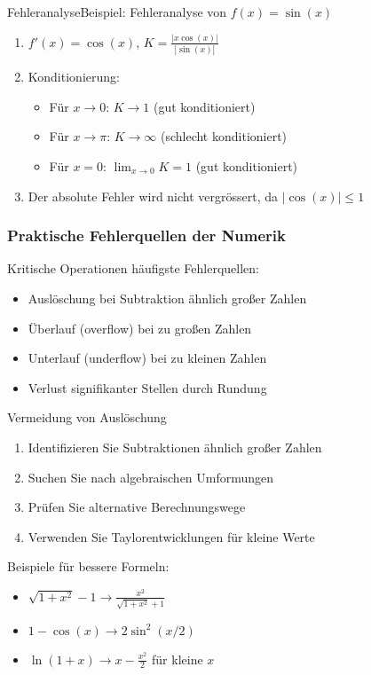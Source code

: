 \begin{example2}{Fehleranalyse}Beispiel: Fehleranalyse von $f(x)=\sin(x)$
\begin{enumerate}
    \item $f'(x) = \cos(x)$, $K = \frac{|x\cos(x)|}{|\sin(x)|}$
    \item Konditionierung:
    \begin{itemize}
    \item Für $x \to 0$: $K \to 1$ (gut konditioniert)
    \item Für $x \to \pi$: $K \to \infty$ (schlecht konditioniert)
    \item Für $x = 0$: $\lim_{x \to 0} K = 1$ (gut konditioniert)
    \end{itemize}
    \item Der absolute Fehler wird nicht vergrössert, da $|\cos(x)| \leq 1$
\end{enumerate}
\end{example2}

\subsubsection{Praktische Fehlerquellen der Numerik}

\begin{concept}{Kritische Operationen} häufigste Fehlerquellen:
\begin{itemize}
    \item Auslöschung bei Subtraktion ähnlich großer Zahlen
    \item Überlauf (overflow) bei zu großen Zahlen
    \item Unterlauf (underflow) bei zu kleinen Zahlen
    \item Verlust signifikanter Stellen durch Rundung
\end{itemize}
\end{concept}

\begin{KR}{Vermeidung von Auslöschung}
\begin{enumerate}
    \item Identifizieren Sie Subtraktionen ähnlich großer Zahlen
    \item Suchen Sie nach algebraischen Umformungen
    \item Prüfen Sie alternative Berechnungswege
    \item Verwenden Sie Taylorentwicklungen für kleine Werte
\end{enumerate}

Beispiele für bessere Formeln:
    \begin{itemize}
        \item $\sqrt{1+x^2}-1 \rightarrow \frac{x^2}{\sqrt{1+x^2}+1}$
        \item $1-\cos(x) \rightarrow 2\sin^2(x/2)$
        \item $\ln(1+x) \rightarrow x-\frac{x^2}{2}$ für kleine $x$
    \end{itemize}
\end{KR}


